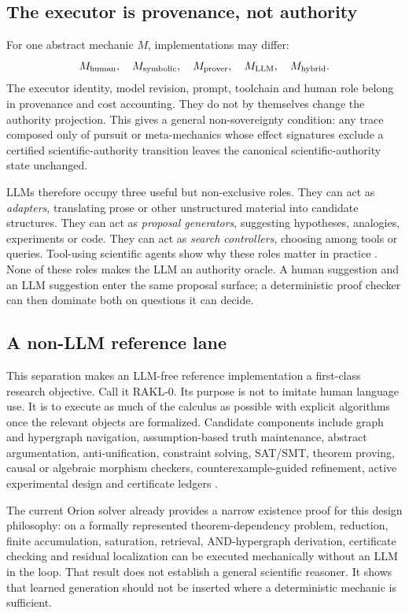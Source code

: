 \subsection{The executor is provenance, not authority}

For one abstract mechanic $M$, implementations may differ:
\[
M_{\rm human},\quad M_{\rm symbolic},\quad M_{\rm prover},\quad M_{\rm LLM},\quad M_{\rm hybrid}.
\]
The executor identity, model revision, prompt, toolchain and human role belong in provenance and cost accounting. They do not by themselves change the authority projection. This gives a general non-sovereignty condition: any trace composed only of pursuit or meta-mechanics whose effect signatures exclude a certified scientific-authority transition leaves the canonical scientific-authority state unchanged.

LLMs therefore occupy three useful but non-exclusive roles. They can act as \emph{adapters}, translating prose or other unstructured material into candidate structures. They can act as \emph{proposal generators}, suggesting hypotheses, analogies, experiments or code. They can act as \emph{search controllers}, choosing among tools or queries. Tool-using scientific agents show why these roles matter in practice \cite{boiko2023coscientist,bran2024chemcrow,gottweis2026coscientist,ghareeb2026multiagent}. None of these roles makes the LLM an authority oracle. A human suggestion and an LLM suggestion enter the same proposal surface; a deterministic proof checker can then dominate both on questions it can decide.

\subsection{A non-LLM reference lane}\label{sec:rakl0}

This separation makes an LLM-free reference implementation a first-class research objective. Call it \textsc{RAKL-0}. Its purpose is not to imitate human language use. It is to execute as much of the calculus as possible with explicit algorithms once the relevant objects are formalized. Candidate components include graph and hypergraph navigation, assumption-based truth maintenance, abstract argumentation, anti-unification, constraint solving, SAT/SMT, theorem proving, causal or algebraic morphism checkers, counterexample-guided refinement, active experimental design and certificate ledgers \cite{dekleer1986,dung1995,clarke2000cegar,blackwell1953,hay2014computations}.

The current Orion solver already provides a narrow existence proof for this design philosophy: on a formally represented theorem-dependency problem, reduction, finite accumulation, saturation, retrieval, AND-hypergraph derivation, certificate checking and residual localization can be executed mechanically without an LLM in the loop. That result does not establish a general scientific reasoner. It shows that learned generation should not be inserted where a deterministic mechanic is sufficient.

